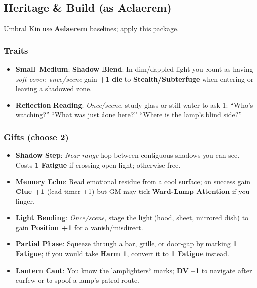 \documentclass[11pt,letterpaper]{article}
\begin{document}
\subsection*{Heritage \& Build (as Aelaerem)}
Umbral Kin use \textbf{Aelaerem} baselines; apply this package.

\subsubsection*{Traits}
\begin{itemize}
\item \textbf{Small--Medium}; \textbf{Shadow Blend}: In dim/dappled light you count as having \emph{soft cover}; \emph{once/scene} gain \textbf{+1 die} to \textbf{Stealth/Subterfuge} when entering or leaving a shadowed zone.
\item \textbf{Reflection Reading}: \emph{Once/scene}, study glass or still water to ask 1: ``Who's watching?'' ``What was just done here?'' ``Where is the lamp's blind side?''
\end{itemize}

\subsubsection*{Gifts (choose 2)}
\begin{itemize}
\item \textbf{Shadow Step}: \emph{Near-range} hop between contiguous shadows you can see. Costs \textbf{1 Fatigue} if crossing open light; otherwise free.
\item \textbf{Memory Echo}: Read emotional residue from a cool surface; on success gain \textbf{Clue +1} (lead timer +1) but GM may tick \textbf{Ward-Lamp Attention} if you linger.
\item \textbf{Light Bending}: \emph{Once/scene}, stage the light (hood, sheet, mirrored dish) to gain \textbf{Position +1} for a vanish/misdirect.
\item \textbf{Partial Phase}: Squeeze through a bar, grille, or door-gap by marking \textbf{1 Fatigue}; if you would take \textbf{Harm 1}, convert it to \textbf{1 Fatigue} instead.
\item \textbf{Lantern Cant}: You know the lamplighters`` marks; \textbf{DV --1} to navigate after curfew or to spoof a lamp's patrol route.
\end{itemize}
\end{document}
